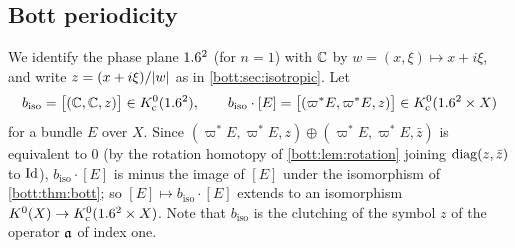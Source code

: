 \subsection{Bott periodicity}
We identify the phase plane $1.6^2$ (for $n=1$) with $\mathbb{C}$ by $w=(x,\xi)\mapsto x+i\xi$, and
write $z=(x+i\xi)/\lvert w\rvert$ as in \cref{bott:sec:isotropic}. Let
\begin{equation}\label{bott:eq:biso}
  b_{\mathrm{iso}}=\bigl[(\mathbb{C},\mathbb{C},z)\bigr]\in K_{\mathrm{c}}^0(1.6^2),\qquad
  b_{\mathrm{iso}}\cdot[E]=\bigl[(\varpi^*E,\varpi^*E,z)\bigr]\in K_{\mathrm{c}}^0(1.6^2\times X)
\end{equation}
for a bundle $E$ over $X$. Since $(\varpi^*E,\varpi^*E,z)\oplus(\varpi^*E,\varpi^*E,\bar z)$
is equivalent to $0$ (by the rotation homotopy of \cref{bott:lem:rotation} joining
$\operatorname{diag}(z,\bar z)$ to $\operatorname{Id}$), $b_{\mathrm{iso}}\cdot[E]$ is minus the image of $[E]$ under the
isomorphism of \cref{bott:thm:bott}; so $[E]\mapsto b_{\mathrm{iso}}\cdot[E]$ extends to an
isomorphism $K^0(X)\to K_{\mathrm{c}}^0(1.6^2\times X)$. Note that $b_{\mathrm{iso}}$ is the clutching of the
symbol $z$ of the operator $\mathfrak{a}$ of index one.

